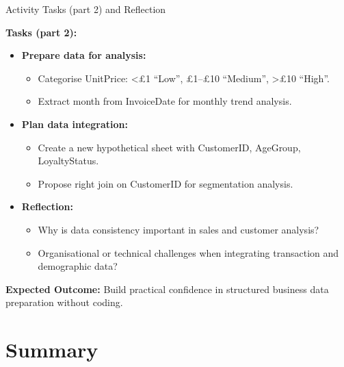 \documentclass[aspectratio=169, table]{beamer}
\begin{document}
\begin{frame}{Activity Tasks (part 2) and Reflection}
	\vspace{20pt}
	
	\textbf{Tasks (part 2):}
	\begin{itemize}
		\item \textbf{Prepare data for analysis:}
		\begin{itemize}
			\item Categorise UnitPrice: <£1 “Low”, £1–£10 “Medium”, >£10 “High”.
			\item Extract month from InvoiceDate for monthly trend analysis.
		\end{itemize}
		
		\item \textbf{Plan data integration:}
		\begin{itemize}
			\item Create a new hypothetical sheet with CustomerID, AgeGroup, LoyaltyStatus.
			\item Propose right join on CustomerID for segmentation analysis.
		\end{itemize}
		
		\item \textbf{Reflection:}
		\begin{itemize}
			\item Why is data consistency important in sales and customer analysis?
			\item Organisational or technical challenges when integrating transaction and demographic data?
		\end{itemize}
	\end{itemize}
	
	\textbf{Expected Outcome:} Build practical confidence in structured business data preparation without coding.
	
\end{frame}

\section{Summary}
\end{document}
